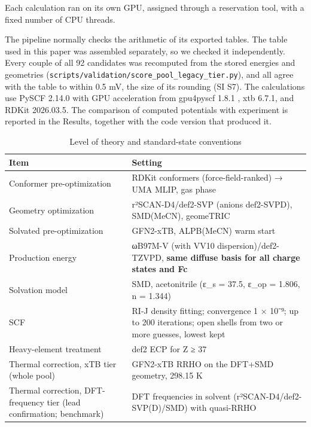 \documentclass[journal=jcisd8,manuscript=article]{achemso}
\begin{document}
Each calculation ran on its own GPU, assigned through a reservation tool, with a fixed number of CPU threads.

The pipeline normally checks the arithmetic of its exported tables. The table used in this paper was assembled separately, so we checked it independently. Every couple of all 92 candidates was recomputed from the stored energies and geometries (\texttt{scripts/validation/score\_pool\_legacy\_tier.py}), and all agree with the table to within 0.5 mV, the size of its rounding (SI S7). The calculations use PySCF 2.14.0 \cite{sun2020} with GPU acceleration from gpu4pyscf 1.8.1 \cite{li2025,wu2025}, xtb 6.7.1, and RDKit 2026.03.5. The comparison of computed potentials with experiment is reported in the Results, together with the code version that produced it.

\begin{table}[htbp]
\caption{Level of theory and standard-state conventions}\label{tab:1}
\small
\begin{tabularx}{\textwidth}{@{}>{\raggedright\arraybackslash}X>{\raggedright\arraybackslash}X@{}}
\hline
Item & Setting \\ \hline
Conformer pre-\allowbreak{}optimization & RDKit conformers (force-\allowbreak{}field-\allowbreak{}ranked) → UMA MLIP, gas phase \\
Geometry optimization & r²SCAN-\allowbreak{}D4/def2-\allowbreak{}SVP (anions def2-\allowbreak{}SVPD), SMD(MeCN), geomeTRIC \\
Solvated pre-\allowbreak{}optimization & GFN2-\allowbreak{}xTB, ALPB(MeCN) warm start \\
Production energy & ωB97M-\allowbreak{}V (with VV10 dispersion)/def2-\allowbreak{}TZVPD, \textbf{same diffuse basis for all charge states and Fc} \\
Solvation model & SMD, acetonitrile (ε\_\allowbreak{}s = 37.5, ε\_\allowbreak{}op = 1.806, n = 1.344) \\
SCF & RI-\allowbreak{}J density fitting; convergence 1 × 10⁻⁹; up to 200 iterations; open shells from two or more guesses, lowest kept \\
Heavy-\allowbreak{}element treatment & def2 ECP for Z ≥ 37 \\
Thermal correction, xTB tier (whole pool) & GFN2-\allowbreak{}xTB RRHO on the DFT+SMD geometry, 298.15 K \\
Thermal correction, DFT-\allowbreak{}frequency tier (lead confirmation; benchmark) & DFT frequencies in solvent (r²SCAN-\allowbreak{}D4/def2-\allowbreak{}SVP(D)/SMD) with quasi-\allowbreak{}RRHO \\

\end{tabularx}
\end{table}
\end{document}
